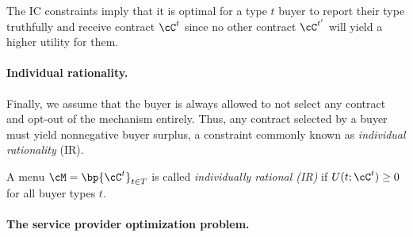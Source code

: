 The IC constraints imply that it is optimal for a type $t$ buyer to report their type truthfully and receive contract $\cC^t$ since no other contract $\cC^{t'}$ will yield a higher utility for them. 



\paragraph{Individual rationality.}

Finally, we assume that the buyer is always allowed to not select any contract and opt-out of the mechanism entirely. Thus, any contract selected by a buyer must yield nonnegative buyer surplus, a constraint commonly known as \emph{individual rationality} (IR).
\begin{definition*}
A menu $\cM = \bp{\cC^t}_{t\in T}$ is called \emph{individually rational (IR)} if $U(t; \cC^t)  \geq 0$ for all buyer types $t$.
\end{definition*}



\paragraph{The service provider optimization problem.}


